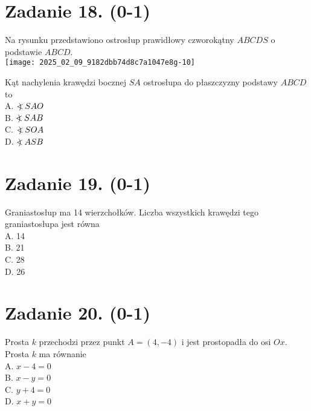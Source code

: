 \documentclass[10pt]{article}
\newcommand\Varangle{\mathop{{<\!\!\!\!\!\text{\small)}}\:}\nolimits}
\begin{document}
\section*{Zadanie 18. (0-1)}
Na rysunku przedstawiono ostrosłup prawidłowy czworokątny \(A B C D S\) o podstawie \(A B C D\).\\
\texttt{[image: 2025\_02\_09\_9182dbb74d8c7a1047e8g-10]}

Kąt nachylenia krawędzi bocznej \(S A\) ostrosłupa do płaszczyzny podstawy \(A B C D\) to\\
A. \(\Varangle S A O\)\\
B. \(\Varangle S A B\)\\
C. \(\Varangle S O A\)\\
D. \(\Varangle A S B\)

\section*{Zadanie 19. (0-1)}
Graniastosłup ma 14 wierzchołków. Liczba wszystkich krawędzi tego graniastosłupa jest równa\\
A. 14\\
B. 21\\
C. 28\\
D. 26

\section*{Zadanie 20. (0-1)}
Prosta \(k\) przechodzi przez punkt \(A=(4,-4)\) i jest prostopadła do osi \(O x\). Prosta \(k\) ma równanie\\
A. \(x-4=0\)\\
B. \(x-y=0\)\\
C. \(y+4=0\)\\
D. \(x+y=0\)
\end{document}
